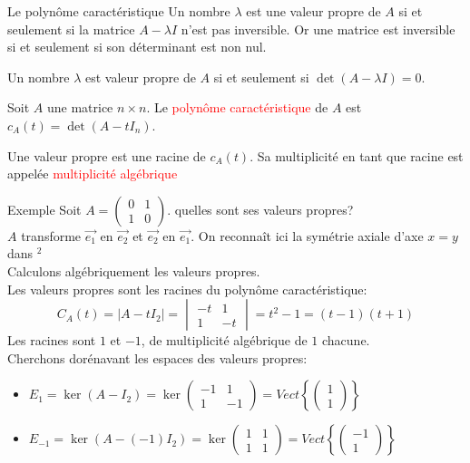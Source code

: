 \begin{parag}{Le polynôme caractéristique}
    Un nombre $\lambda$ est une valeur propre de $A$ si et seulement si la matrice $A - \lambda I$ n'est pas inversible. Or une matrice est inversible si et seulement si son déterminant est non nul.
    \begin{theoreme}
        Un nombre $\lambda$ est valeur propre de $A$ si et seulement si $\det (A - \lambda I) = 0$.
    \end{theoreme}
    \begin{definition}
        Soit $A$ une matrice $n \times n$. Le \textcolor{red}{polynôme caractéristique} de $A$ est $c_A(t) = \det(A - tI_n)$.
    \end{definition}
    Une valeur propre est une racine de $c_A(t)$. Sa multiplicité en tant que racine est appelée \textcolor{red}{multiplicité algébrique}


    \begin{subparag}{Exemple}
        Soit $A = \begin{pmatrix}
            0 & 1 \\ 1 & 0
        \end{pmatrix}$. quelles sont ses valeurs propres?
        \\
        $A$ transforme $\vec{e_1}$ en $\vec{e_2}$ et $\vec{e_2}$ en $\vec{e_1}$. On reconnaît ici la symétrie axiale d'axe $x = y$ dans \R$^2$\\
        Calculons algébriquement les valeurs propres.
        \\
        Les valeurs propres sont les racines du polynôme caractéristique:
        \[C_A(t) = |A - tI_2| = \begin{vmatrix}
            -t & 1 \\ 1 & -t
        \end{vmatrix} = t^2 -1 = (t-1)(t+1)\]
        Les racines sont $1$ et $-1$, de multiplicité algébrique de $1$ chacune.\\
        Cherchons dorénavant les espaces des valeurs propres:
        \begin{itemize}
            \item $E_1 = \ker(A - I_2) = \ker \begin{pmatrix}
                -1 & 1 \\ 1 & -1
            \end{pmatrix} = Vect\left\{\begin{pmatrix}
                1 \\ 1
            \end{pmatrix}\right\}$
            \item $E_{-1} = \ker(A - (-1)I_2) = \ker \begin{pmatrix}
                1 & 1 \\ 1 & 1
            \end{pmatrix} = Vect\left\{\begin{pmatrix}
                -1 \\ 1
            \end{pmatrix}\right\}$
            

\end{itemize}
\end{subparag}
\end{parag}
